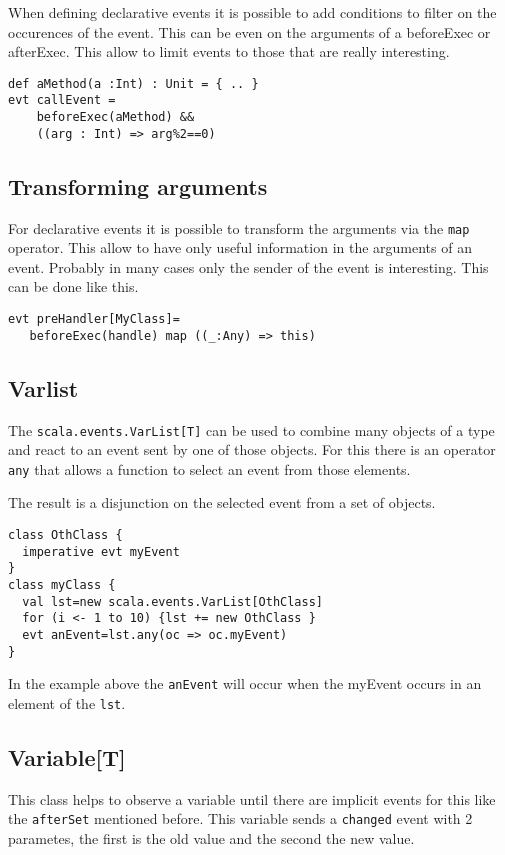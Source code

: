 \documentclass{article}
\begin{document}
When defining declarative events it is possible to add conditions
to filter on the occurences of the event. This can be even on the 
arguments of a beforeExec or afterExec. This allow to limit events 
to those that are really interesting.

\begin{lstlisting}
def aMethod(a :Int) : Unit = { .. }
evt callEvent = 
    beforeExec(aMethod) && 
    ((arg : Int) => arg%2==0)
\end{lstlisting}

\subsection{Transforming arguments}
For declarative events it is possible to transform the arguments
via the {\tt map} operator. This allow to have only useful information
in the arguments of an event. Probably in many cases only the sender of
the event is interesting. This can be done like this.

\begin{lstlisting}
evt preHandler[MyClass]=
   beforeExec(handle) map ((_:Any) => this)
\end{lstlisting}

\subsection{Varlist}
The {\tt scala.events.VarList[T]} can be used to combine many objects
of a type and react to an event sent by one of those objects. For this 
there is an operator {\tt any} that allows a function to select an 
event from those elements.

The result is a disjunction on the selected event from a set of objects.

\begin{lstlisting}
class OthClass {
  imperative evt myEvent 
}
class myClass {
  val lst=new scala.events.VarList[OthClass]
  for (i <- 1 to 10) {lst += new OthClass }
  evt anEvent=lst.any(oc => oc.myEvent)
}
\end{lstlisting}

In the example above the {\tt anEvent} will occur when the myEvent
 occurs in an element of the {\tt lst}.


\subsection{Variable[T]}
This class helps to observe a variable until there are implicit events
for this like the {\tt afterSet} mentioned before. This variable sends 
a {\tt changed} event with 2 parametes, the first is the old value
and the second the new value.
\end{document}
